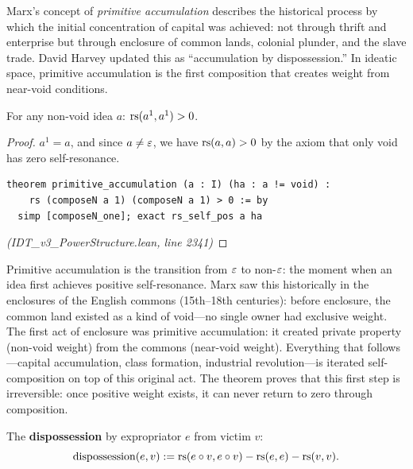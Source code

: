 Marx's concept of \emph{primitive accumulation} describes the historical
process by which the initial concentration of capital was achieved: not through
thrift and enterprise but through enclosure of common lands, colonial plunder,
and the slave trade. David Harvey updated this as ``accumulation by
dispossession.'' In ideatic space, primitive accumulation is the first
composition that creates weight from near-void conditions.

\begin{theorem}
\label{thm:primitive-accumulation}
For any non-void idea $a$:
$\mathrm{rs}(a^1, a^1) > 0$.
\end{theorem}

\begin{proof}
$a^1 = a$, and since $a \neq \varepsilon$, we have $\mathrm{rs}(a,a) > 0$ by the axiom
that only void has zero self-resonance.
\begin{lstlisting}
theorem primitive_accumulation (a : I) (ha : a != void) :
    rs (composeN a 1) (composeN a 1) > 0 := by
  simp [composeN_one]; exact rs_self_pos a ha
\end{lstlisting}
\textit{(IDT\_v3\_PowerStructure.lean, line 2341)}
\end{proof}

\begin{interpretation}
Primitive accumulation is the transition from $\varepsilon$ to non-$\varepsilon$: the
moment when an idea first achieves positive self-resonance. Marx saw this
historically in the enclosures of the English commons (15th--18th centuries):
before enclosure, the common land existed as a kind of void---no single owner
had exclusive weight. The first act of enclosure was primitive accumulation:
it created private property (non-void weight) from the commons (near-void
weight). Everything that follows---capital accumulation, class formation,
industrial revolution---is iterated self-composition on top of this original
act. The theorem proves that this first step is irreversible: once positive
weight exists, it can never return to zero through composition.
\end{interpretation}

\begin{definition}[Dispossession]
\label{def:dispossession}
The \textbf{dispossession} by expropriator $e$ from victim $v$:
\[
  \mathrm{dispossession}(e, v) := \mathrm{rs}(e \circ v, e \circ v) - \mathrm{rs}(e,e) - \mathrm{rs}(v,v).
\]
\end{definition}

